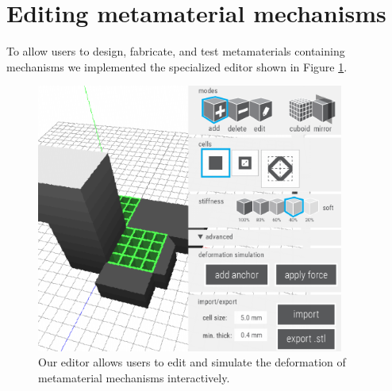 



\section{Editing metamaterial mechanisms}

To allow users to design, fabricate, and test metamaterials containing mechanisms we implemented the specialized editor shown in Figure \ref{fig:20-editor-ui}. 

\begin{figure} [h]
    \centering
    \includegraphics[width=0.9\textwidth]{chapters/metamaterial-mechanisms-FIG/20-editor-ui.pdf}
    \caption[Short figure name.]{Our editor allows users to edit and simulate the deformation of metamaterial mechanisms interactively. 
    \label{fig:20-editor-ui}}
\end{figure}

